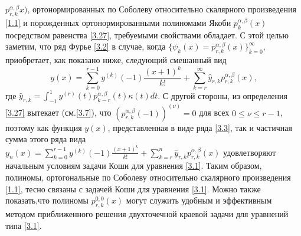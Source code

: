 $p_{r,k}^{\alpha,\beta}x)$, ортонормированных по Соболеву относительно скалярного произведения \eqref{1.1} и порожденных ортонормированными полиномами Якоби $p_k^{\alpha,\beta}(x)$  посредством равенства \eqref{3.27}, требуемыми свойствами обладает.
   С этой целью заметим, что ряд Фурье \eqref{3.2} в случае, когда $\{\psi_k(x)=p_{r,k}^{\alpha,\beta}(x)\}_{k=0}^\infty$, приобретает, как показано ниже, следующий смешанный вид
   \begin{equation}\label{3.3}
y(x)= \sum_{k=0}^{r-1} y^{(k)}(-1)\frac{(x+1)^k}{k!}+ \sum_{k=r}^\infty \hat y_{r,k}p_{r,k}^{\alpha,\beta}(x),
\end{equation}
где  $ \hat y_{r,k}=\int_{-1}^1 y^{(r)}(t)p_{k-r}^{\alpha,\beta}(t)\kappa(t)dt$.
С другой стороны, из определения \eqref{3.27} вытекает (см.\eqref{3.7}), что $(p_{r,k}^{\alpha,\beta}(-1))^{(\nu)}=0$ для всех $0\le\nu\le r-1$, поэтому как функция $y(x)$, представленная в виде ряда \eqref{3.3}, так и частичная  сумма этого ряда вида
$
y_n(x)= \sum_{k=0}^{r-1} y^{(k)}(-1)\frac{(x+1)^k}{k!}+ \sum_{k=r}^n \hat y_{r,k}p_{r,k}^{\alpha,\beta}(x)
$
удовлетворяют начальным условиям задачи Коши для уравнения \eqref{3.1}.
Таким образом, полиномы, ортогональные по Соболеву относительно скалярного произведения \eqref{1.1}, тесно связаны с задачей Коши для уравнения \eqref{3.1}. Можно также показать,что полиномы $p_{r,k}^{0,0}(x)$ могут служить удобным и эффективным методом приближенного решения двухточечной краевой задачи для уравнений типа \eqref{3.1}.





